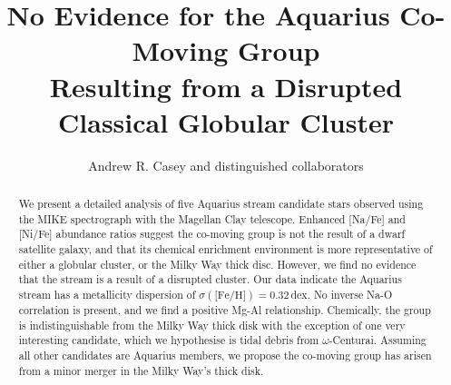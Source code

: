 \documentclass{emulateapj}
\begin{document}
\title{No Evidence for the Aquarius Co-Moving Group \\Resulting from a Disrupted Classical Globular Cluster}





\author{Andrew R. Casey and distinguished collaborators}


\begin{abstract}
We present a detailed analysis of five Aquarius stream candidate stars observed using the MIKE spectrograph with the Magellan Clay telescope.  Enhanced [Na/Fe] and [Ni/Fe] abundance ratios suggest the co-moving group is not the result of a dwarf satellite galaxy, and that its chemical enrichment environment is more representative of either a globular cluster, or the Milky Way thick disc. However, we find no evidence that the stream is a result of a disrupted cluster. Our data indicate the Aquarius stream has a  metallicity dispersion of $\sigma(\mbox{[Fe/H}]) = 0.32$\,dex. No inverse Na-O correlation is present, and we find a positive Mg-Al relationship. Chemically, the group is indistinguishable from the Milky Way thick disk with the exception of one very interesting candidate, which we hypothesise is tidal debris from $\omega$-Centurai. Assuming all other candidates are Aquarius members, we propose the co-moving group has arisen from a minor merger in the Milky Way's thick disk.

\end{abstract}
\end{document}
